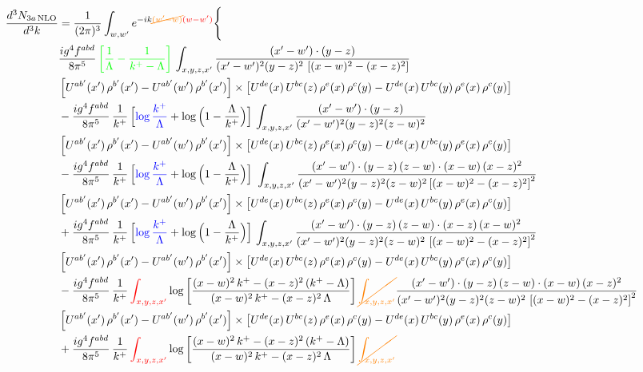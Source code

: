 \documentclass[9pt]{article}
\numberwithin{equation}{section}
\begin{document}
\begin{align}
\frac{d^{3}N_{3a\,\rm NLO}}{d^{3}k} & =\frac{1}{(2\pi)^{3}}\int_{w,w'}e^{-ik{\color{orange}\cancel{(w'-w)}}{\color{red}(w-w')}}\Bigg\{\notag \\ & \frac{ig^{4}f^{abd}}{8\pi^{5}}\,{\color{green}\left[\frac{1}{\Lambda}-\frac{1}{k^{+}-\Lambda}\right]}\,\int_{x,y,z,x'}
\frac{(x'-w')\cdot(y-z)}{(x'-w')^{2}(y-z)^{2}\,\left[(x-w)^{2}-(x-z)^{2}\right]}\notag \\ & \left[U^{ab'}(x')\,\rho^{b'}(x')-U^{ab'}(w')\, \rho^{b'}(x')\right]\times \left[U^{de}(x)\,U^{bc}(z)\, \rho^{e}(x)\,\rho^{c}(y)-U^{de}(x)\,U^{bc}(y)\,\rho^{e}(x)\,\rho^{c}(y)\right]\notag \\ & -\frac{ig^{4}f^{abd}}{8\pi^{5}}\,\frac{1}{k^{+}}\,\Big[{\color{blue}\log\frac{k^{+}}{\Lambda}}+\log\Big(1-\frac{\Lambda}{k^{+}}\Big)\Big]\,\int_{x,y,z,x'}
\frac{(x'-w')\cdot(y-z)}{(x'-w')^{2}(y-z)^{2}(z-w)^{2}}\notag \\ & \left[U^{ab'}(x')\,\rho^{b'}(x')-U^{ab'}(w')\, \rho^{b'}(x')\right]\times \left[U^{de}(x)\,U^{bc}(z)\, \rho^{e}(x)\,\rho^{c}(y)-U^{de}(x)\,U^{bc}(y)\,\rho^{e}(x)\,\rho^{c}(y)\right]\notag \\ & -\frac{ig^{4}f^{abd}}{8\pi^{5}}\,\frac{1}{k^{+}}\,\Big[{\color{blue}\log\frac{k^{+}}{\Lambda}}+\log\Big(1-\frac{\Lambda}{k^{+}}\Big)\Big]\,\,\int_{x,y,z,x'}
\frac{(x'-w')\cdot(y-z)\,(z-w)\cdot(x-w)\,(x-z)^{2}}{(x'-w')^{2}(y-z)^{2}(z-w)^{2}\left[(x-w)^{2}-(x-z)^{2}\right]^{2}}\notag \\ & \left[U^{ab'}(x')\,\rho^{b'}(x')-U^{ab'}(w')\, \rho^{b'}(x')\right]\times \left[U^{de}(x)\,U^{bc}(z)\, \rho^{e}(x)\,\rho^{c}(y)-U^{de}(x)\,U^{bc}(y)\,\rho^{e}(x)\,\rho^{c}(y)\right]\notag \\ & +\frac{ig^{4}f^{abd}}{8\pi^{5}}\,\frac{1}{k^{+}}\,\Big[{\color{blue}\log\frac{k^{+}}{\Lambda}}+\log\Big(1-\frac{\Lambda}{k^{+}}\Big)\Big]\,\int_{x,y,z,x'}
\frac{(x'-w')\cdot(y-z)\,(z-w)\cdot(x-z)\,(x-w)^{2}}{(x'-w')^{2}(y-z)^{2}(z-w)^{2}\,\left[(x-w)^{2}-(x-z)^{2}\right]^{2}}\notag \\ & \left[U^{ab'}(x')\,\rho^{b'}(x')-U^{ab'}(w')\, \rho^{b'}(x')\right]\times \left[U^{de}(x)\,U^{bc}(z)\, \rho^{e}(x)\,\rho^{c}(y)-U^{de}(x)\,U^{bc}(y)\,\rho^{e}(x)\,\rho^{c}(y)\right]\notag \\ & 
-\frac{ig^{4}f^{abd}}{8\pi^{5}}\,\frac{1}{k^{+}}\,{\color{red}\int_{x,y,z,x'}}\log{\left[\frac{(x-w)^{2}\,k^{+}-(x-z)^{2}\,(k^{+}-\Lambda)}{(x-w)^{2}\,k^{+}-(x-z)^{2}\,\Lambda}\right]}\,{\color{orange}\cancel{\int_{x,y,z,x'}}}
\frac{(x'-w')\cdot(y-z)\,(z-w)\cdot(x-w)\,(x-z)^{2}}{(x'-w')^{2}(y-z)^{2}(z-w)^{2}\,\left[(x-w)^{2}-(x-z)^{2}\right]^{2}}\notag \\ & \left[U^{ab'}(x')\,\rho^{b'}(x')-U^{ab'}(w')\, \rho^{b'}(x')\right]\times \left[U^{de}(x)\,U^{bc}(z)\, \rho^{e}(x)\,\rho^{c}(y)-U^{de}(x)\,U^{bc}(y)\,\rho^{e}(x)\,\rho^{c}(y)\right]\notag \\ & +\frac{ig^{4}f^{abd}}{8\pi^{5}}\,\frac{1}{k^{+}}\,{\color{red}\int_{x,y,z,x'}}\log{\left[\frac{(x-w)^{2}\,k^{+}-(x-z)^{2}\,(k^{+}-\Lambda)}{(x-w)^{2}\,k^{+}-(x-z)^{2}\,\Lambda}\right]}\,{\color{orange}\cancel{\int_{x,y,z,x'}}}

\end{align}
\end{document}
